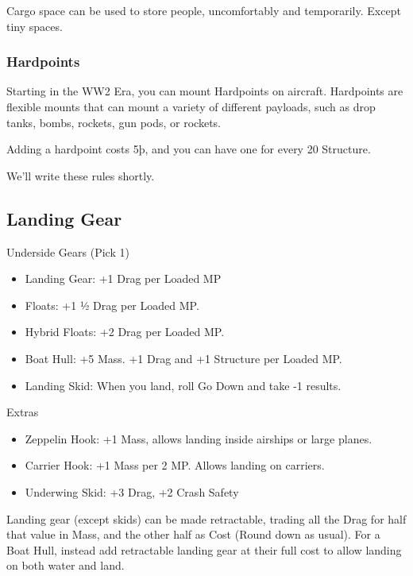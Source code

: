 \documentclass{article}
\begin{document}
Cargo space can be used to store people, uncomfortably and temporarily.
Except tiny spaces.

\subsubsection{Hardpoints}
\label{_Hardpoints}

Starting in the WW2 Era, you can mount Hardpoints on aircraft.
Hardpoints are flexible mounts that can mount a variety of different
payloads, such as drop tanks, bombs, rockets, gun pods, or rockets.

Adding a hardpoint costs 5þ, and you can have one for every 20
Structure.

We'll write these rules shortly.

\subsection{Landing Gear}
\label{_Landing_Gear}

Underside Gears (Pick 1)

\begin{itemize}
  \item          Landing Gear: +1 Drag per Loaded MP
  \item          Floats: +1 ½ Drag per Loaded MP.
  \item          Hybrid Floats: +2 Drag per Loaded MP.
  \item          Boat Hull: +5 Mass. +1 Drag and +1 Structure per Loaded MP.
  \item          Landing Skid: When you land, roll Go Down and take -1 results.
\end{itemize}

Extras

\begin{itemize}
  \item          Zeppelin Hook: +1 Mass, allows landing inside airships or large
        planes.
\end{itemize}

\begin{itemize}
  \item          Carrier Hook: +1 Mass per 2 MP. Allows landing on carriers.
  \item          Underwing Skid: +3 Drag, +2 Crash Safety
\end{itemize}

Landing gear (except skids) can be made retractable, trading all the
Drag for half that value in Mass, and the other half as Cost (Round down
as usual). For a Boat Hull, instead add retractable landing gear at
their full cost to allow landing on both water and land.
\end{document}
